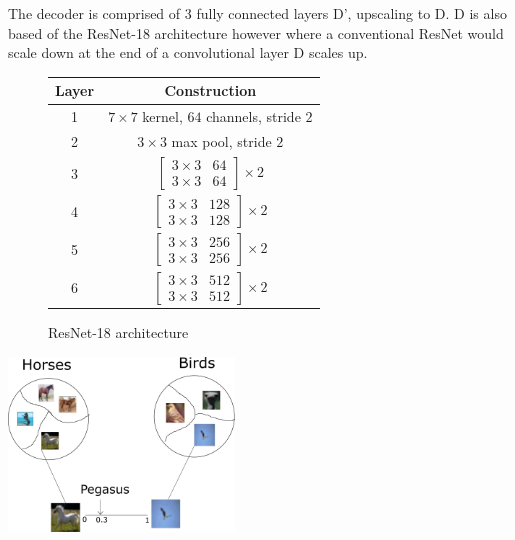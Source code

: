 \documentclass{article}
\begin{document}
The decoder is comprised of 3 fully connected layers D', upscaling to D. D is also based of the ResNet-18 architecture however where a conventional ResNet would scale down at the end of a convolutional layer D scales up.


\begin{figure}
    \begin{center}
\begin{tabular}{c|c}
    Layer&Construction\\
    \hline
    1 & $7\times7$ kernel, $64$ channels, stride $2$\\
    2 & $3\times3$ max pool, stride $2$\\
    3 & $\begin{bmatrix} 3 \times 3 & 64 \\ 3 \times 3 & 64 \end{bmatrix} \times 2$\\
    4 & $\begin{bmatrix} 3 \times 3 & 128 \\ 3 \times 3 & 128 \end{bmatrix} \times 2$\\
    5 & $\begin{bmatrix} 3 \times 3 & 256 \\ 3 \times 3 & 256 \end{bmatrix} \times 2$\\
    6 & $\begin{bmatrix} 3 \times 3 & 512 \\ 3 \times 3 & 512 \end{bmatrix} \times 2$\\
\end{tabular}
\end{center}
\caption{ResNet-18 architecture}
\label{tab:res18}
\end{figure}


\begin{center}
    \includegraphics[width=0.45\textwidth]{figures/clustering.png}
\end{center}
\end{document}
